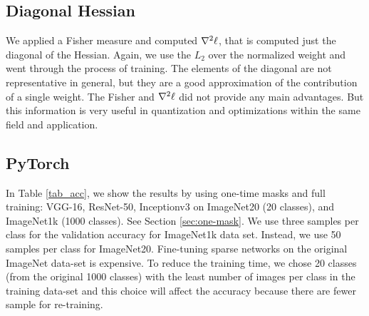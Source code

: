\documentclass[conference]{IEEEtran}
\begin{document}
\subsection{Diagonal Hessian}
We applied a Fisher measure and computed $\nabla^2{\bf \ell}$, that is
computed just the diagonal of the Hessian. Again, we use the $L_2$
over the normalized weight and went through the process of
training. The elements of the diagonal are not representative in
general, but they are a good approximation of the contribution of a
single weight.  The Fisher and $\nabla^2{\bf \ell}$ did not provide
any main advantages. But this information is very useful in
quantization and optimizations within the same field and application.

\subsection{PyTorch} 
\label{sec:pytorch}


In Table \ref{tab_acc}, we show the results by using one-time masks
and full training: VGG-16, ResNet-50, Inceptionv3 on ImageNet20 (20
classes), and ImageNet1k (1000 classes). See Section
\ref{sec:one-mask}. We use three samples per class for the validation
accuracy for ImageNet1k data set. Instead, we use 50 samples per class
for ImageNet20. Fine-tuning sparse networks on the original ImageNet
data-set \cite{deng2009imagenet} is expensive. To reduce the training
time, we chose 20 classes (from the original 1000 classes) with the
least number of images per class in the training data-set and this
choice will affect the accuracy because there are fewer sample for
re-training.
\end{document}

